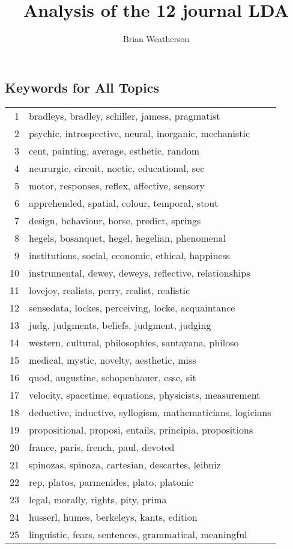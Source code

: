 \documentclass[
]{article}
\title{Analysis of the 12 journal LDA}
\author{Brian Weatherson}
\date{}
\begin{document}
\maketitle

\hypertarget{keywords-for-all-topics}{%
\subsection{Keywords for All Topics}\label{keywords-for-all-topics}}

\begin{tabular}{rl}
\toprule
1 & bradleys, bradley, schiller, jamess, pragmatist\\
2 & psychic, introspective, neural, inorganic, mechanistic\\
3 & cent, painting, average, esthetic, random\\
4 & neururgic, circuit, noetic, educational, sec\\
5 & motor, responses, reflex, affective, sensory\\
6 & apprehended, spatial, colour, temporal, stout\\
7 & design, behaviour, horse, predict, springs\\
8 & hegels, bosanquet, hegel, hegelian, phenomenal\\
9 & institutions, social, economic, ethical, happiness\\
10 & instrumental, dewey, deweys, reflective, relationships\\
11 & lovejoy, realists, perry, realist, realistic\\
12 & sensedata, lockes, perceiving, locke, acquaintance\\
13 & judg, judgments, beliefs, judgment, judging\\
14 & western, cultural, philosophies, santayana, philoso\\
15 & medical, mystic, novelty, aesthetic, miss\\
16 & quod, augustine, schopenhauer, esse, sit\\
17 & velocity, spacetime, equations, physicists, measurement\\
18 & deductive, inductive, syllogism, mathematicians, logicians\\
19 & propositional, proposi, entails, principia, propositions\\
20 & france, paris, french, paul, devoted\\
21 & spinozas, spinoza, cartesian, descartes, leibniz\\
22 & rep, platos, parmenides, plato, platonic\\
23 & legal, morally, rights, pity, prima\\
24 & husserl, humes, berkeleys, kants, edition\\
25 & linguistic, fears, sentences, grammatical, meaningful\\
\bottomrule
\end{tabular}
\newpage
\end{document}
